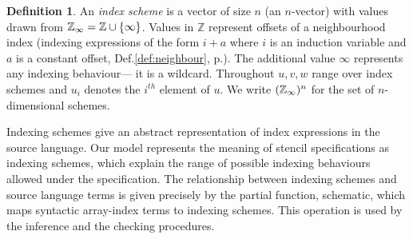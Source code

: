 \documentclass[9pt]{sigplanconf}
\newcounter{block}
\theoremstyle{definition}
\newtheorem{definition}[block]{Definition}
\begin{document}
\begin{definition}
An \emph{index scheme} is a vector of size $n$ (an $n$-vector)
with values drawn from $\mathbb{Z}_\infty = \mathbb{Z} \cup \{\infty\}$.
Values in $\mathbb{Z}$ represent offsets
of a neighbourhood index (indexing
expressions of the form $i + a$ where $i$ is an induction variable
and $a$ is a constant offset, Def.\ref{def:neighbour},
p.\pageref{def:neighbour}). The additional value
$\infty$ represents any indexing behaviour--- it is a
wildcard.
Throughout $u, v, w$ range over index schemes and $u_i$ denotes
the $i^{th}$ element of $u$. We write $(\mathbb{Z}_\infty)^n$ for
the set of $n$-dimensional schemes.

Indexing schemes give an abstract
representation of index expressions in the source language.
Our model represents the meaning of stencil specifications
as indexing schemes, which explain the range of possible
indexing behaviours allowed under the specification.
The relationship between indexing schemes and source language
terms is given precisely by the partial function, \textsf{schematic}, which
maps syntactic array-index terms to indexing schemes. This
operation is used by the inference
and the checking procedures.
\end{definition}
%
\end{document}
